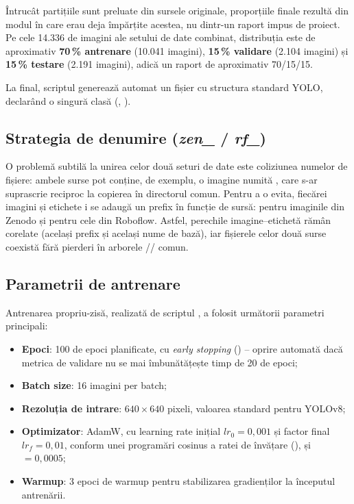 \documentclass[../../main.tex]{subfiles}
\begin{document}
Întrucât partițiile sunt preluate din sursele originale, proporțiile finale rezultă din modul în
care erau deja împărțite acestea, nu dintr-un raport impus de proiect. Pe cele 14.336 de imagini
ale setului de date combinat, distribuția este de aproximativ \textbf{70\,\% antrenare} (10.041 imagini),
\textbf{15\,\% validare} (2.104 imagini) și \textbf{15\,\% testare} (2.191 imagini), adică un raport
de aproximativ 70/15/15.

La final, scriptul generează automat un fișier  cu structura standard YOLO,
declarând o singură clasă (, ).

\subsection{Strategia de denumire (\textit{zen\_} / \textit{rf\_})}
\label{subsec:strategie_denumire}

O problemă subtilă la unirea celor două seturi de date este coliziunea numelor de fișiere: ambele surse
pot conține, de exemplu, o imagine numită , care s-ar suprascrie reciproc la
copierea în directorul comun. Pentru a o evita, fiecărei imagini și etichete i se adaugă un prefix
în funcție de sursă:  pentru imaginile din Zenodo și  pentru
cele din Roboflow. Astfel, perechile imagine--etichetă rămân corelate (același prefix și același
nume de bază), iar fișierele celor două surse coexistă fără pierderi în arborele
// comun.

\subsection{Parametrii de antrenare}
\label{subsec:parametri_antrenare_arme}

Antrenarea propriu-zisă, realizată de scriptul , a folosit
următorii parametri principali:

\begin{itemize}
    \item \textbf{Epoci}: 100 de epoci planificate, cu \textit{early stopping}
    () -- oprire automată dacă metrica de validare nu se mai îmbunătățește
    timp de 20 de epoci;
    \item \textbf{Batch size}: 16 imagini per batch;
    \item \textbf{Rezoluția de intrare}: $640 \times 640$ pixeli, valoarea standard pentru YOLOv8;
    \item \textbf{Optimizator}: AdamW, cu learning rate inițial $lr_0 = 0{,}001$ și factor final
    $lr_f = 0{,}01$, conform unei programări cosinus a ratei de învățare \linebreak
    (), și  $= 0{,}0005$;
    \item \textbf{Warmup}: 3 epoci de warmup pentru stabilizarea gradienților la începutul
    antrenării.
\end{itemize}
\end{document}
